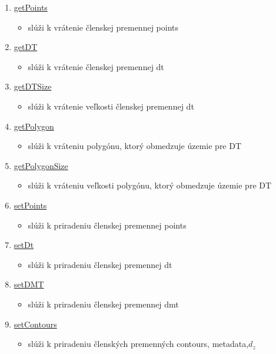 \documentclass[12pt]{article}
\begin{document}
\begin{enumerate}
\item[] \underline{getPoints}
\begin{itemize}
\item slúži k vrátenie členskej premennej points
\end{itemize}

\item[] \underline{getDT}
\begin{itemize}
\item slúži k vrátenie členskej premennej dt
\end{itemize}

\item[] \underline{getDTSize}
\begin{itemize}
\item slúži k vrátenie veľkosti členskej premennej dt
\end{itemize}

\item[] \underline{getPolygon}
\begin{itemize}
\item slúži k vráteniu polygónu, ktorý obmedzuje územie pre DT
\end{itemize}

\item[] \underline{getPolygonSize}
\begin{itemize}
\item slúži k vráteniu veľkosti polygónu, ktorý obmedzuje územie pre DT
\end{itemize}

\item[] \underline{setPoints}
\begin{itemize}
\item slúži k priradeniu členskej premennej points
\end{itemize}

\item[] \underline{setDt}
\begin{itemize}
\item slúži k priradeniu členskej premennej dt
\end{itemize}

\item[] \underline{setDMT}
\begin{itemize}
\item slúži k priradeniu členskej premennej dmt
\end{itemize}

\item[] \underline{setContours}
\begin{itemize}
\item slúži k priradeniu členských premenných contours, metadata,$ d_z $
\end{itemize}


\end{enumerate}
\end{document}
